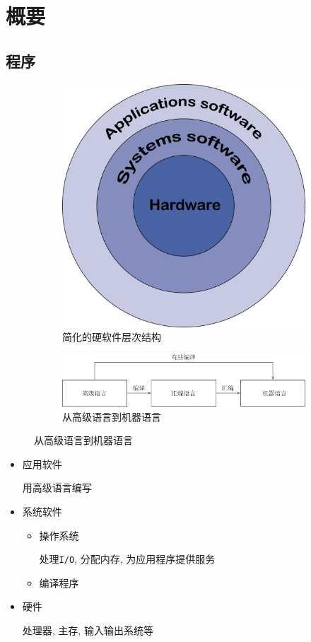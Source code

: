 \chapter{概要}
\section{程序}
\begin{figure}[H]
\centering
\begin{subfigure}{.48\textwidth}
\centering
\includegraphics[scale=.2]{img/figure17.pdf}
\caption{简化的硬软件层次结构}
\end{subfigure}
\begin{subfigure}{.48\textwidth}
\centering
\includegraphics[scale=.3]{img/figure18.pdf}
\caption{从高级语言到机器语言}
\end{subfigure}
\end{figure}
\begin{itemize}
\item 应用软件 \par 用高级语言编写
\item 系统软件
\begin{itemize}
\item 操作系统 \par 处理\verb|I/O|, 分配内存, 为应用程序提供服务
\item 编译程序
\end{itemize}
\item 硬件 \par 处理器, 主存, 输入输出系统等
\end{itemize}
